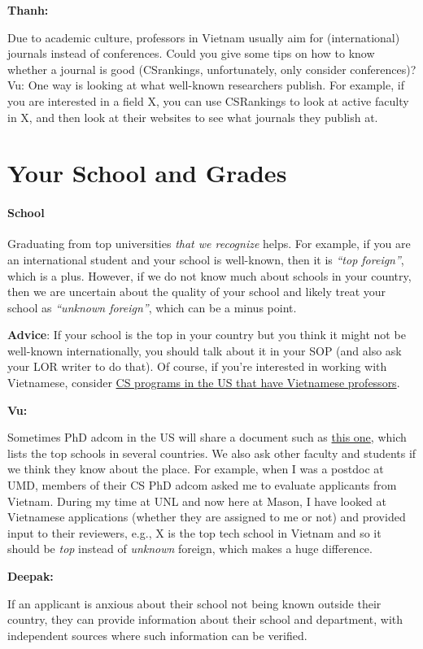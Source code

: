 \documentclass[oneside,11pt,dvipsnames]{book}
\newenvironment{commentbox}[1][]{
  \small
  \begin{mybox}
    {\small \textbf{#1}}
  }{
  \end{mybox}
}
\begin{document}
\begin{commentbox}[Thanh:]
  Due to academic culture, professors in Vietnam usually aim for (international) journals instead of conferences. Could you give some tips on how to know whether a journal is good (CSrankings, unfortunately, only consider conferences)?
  \tcblower
  Vu: One way is looking at what well-known researchers publish. For example, if you are interested in a field X, you can use CSRankings to look at active faculty in X, and then look at their websites to see what journals they publish at.
\end{commentbox}


\section{Your School and Grades}\label{sec:your-school}

\paragraph{School} Graduating from top universities \emph{that we recognize} helps. For example, if you are an international student and your school is well-known, then it is \emph{``top foreign''}, which is a plus.
However, if we do not know much about schools in your country, then we are uncertain about the quality of your school and likely treat your school as \emph{``unknown foreign''}, which can be a minus point.


\textbf{Advice}: If your school is the top in your country but you think it might not be well-known internationally, you should talk about it in your SOP (and also ask your LOR writer to do that). Of course, if you're interested in working with Vietnamese, consider  \href{https://github.com/dynaroars/dynaroars.github.io/wiki/Viet-CS-Profs-US}{CS programs in the US that have Vietnamese professors}. %

\begin{commentbox}[Vu:]
  Sometimes PhD adcom in the US will share a document such as \href{https://github.com/dynaroars/dynaroars.github.io/wiki/Foreign-Top-Schools}{this one}, which lists the top schools in several countries. We also ask other faculty and students if we think they know about the place.  For example, when I was a postdoc at UMD, members of their CS PhD adcom asked me to evaluate applicants from Vietnam.  During my time at UNL and now here at Mason, I have looked at Vietnamese applications (whether they are assigned to me or not) and provided input to their reviewers, e.g., X is the top tech school in Vietnam and so it should be \emph{top} instead of \emph{unknown} foreign, which makes a huge difference.
\end{commentbox}
\begin{commentbox}[Deepak:]
  If an applicant is anxious about their school not being known outside their country, they can provide information about their school and department, with independent sources where such information can be verified.
\end{commentbox}
\end{document}
